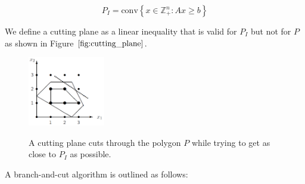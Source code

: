 \documentclass{SMBV12}
\begin{document}
\begin{equation}
P_I = \mbox{conv} \left\lbrace x \in \mathbb{Z}_+^n : Ax \geq b \right\rbrace 
\end{equation}

We define a cutting plane as a linear inequality that is valid for $P_I$ but not for $P$ as shown in Figure $\ref{fig:cutting_plane}$.
\begin{figure}[htbp]
\centering
\includegraphics[width=0.3\textwidth]{images/cutting_plane.png}
\label{fig:cutting_plane}
\caption{A cutting plane cuts through the polygon $P$ while trying to get as close to $P_I$ as possible.}
\end{figure}
A branch-and-cut algorithm is outlined as follows:
\end{document}
